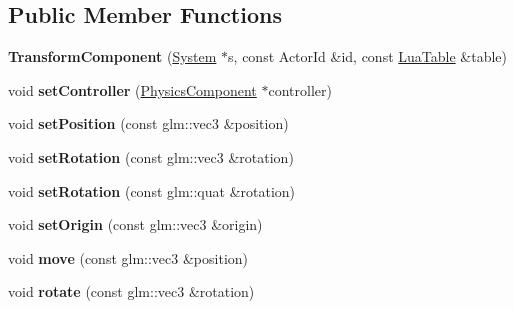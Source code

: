 \subsection*{Public Member Functions}
\begin{DoxyCompactItemize}
\item 
\mbox{\label{classTarbora_1_1TransformComponent_af8e5da2b9ccc2bae161e326a3814c1eb}} 
{\bfseries Transform\+Component} (\hyperlink{classTarbora_1_1System}{System} $\ast$s, const Actor\+Id \&id, const \hyperlink{classTarbora_1_1LuaTable}{Lua\+Table} \&table)
\item 
\mbox{\label{classTarbora_1_1TransformComponent_a76ea0d5430c91ebc1e0c2523edad45b3}} 
void {\bfseries set\+Controller} (\hyperlink{classTarbora_1_1PhysicsComponent}{Physics\+Component} $\ast$controller)
\item 
\mbox{\label{classTarbora_1_1TransformComponent_a57b646968d1f68b337190fc3a25b097b}} 
void {\bfseries set\+Position} (const glm\+::vec3 \&position)
\item 
\mbox{\label{classTarbora_1_1TransformComponent_a1aff5a9a89af7d0d10b3c965225100bc}} 
void {\bfseries set\+Rotation} (const glm\+::vec3 \&rotation)
\item 
\mbox{\label{classTarbora_1_1TransformComponent_a1045aecd38d4257b00d164682c4b42ab}} 
void {\bfseries set\+Rotation} (const glm\+::quat \&rotation)
\item 
\mbox{\label{classTarbora_1_1TransformComponent_a01333383d235e08fedf0294333578030}} 
void {\bfseries set\+Origin} (const glm\+::vec3 \&origin)
\item 
\mbox{\label{classTarbora_1_1TransformComponent_a7f39e3a183fd0aa3a43ef525416187e9}} 
void {\bfseries move} (const glm\+::vec3 \&position)
\item 
\mbox{\label{classTarbora_1_1TransformComponent_aa83be88569a1e5a46058f0927a28f627}} 
void {\bfseries rotate} (const glm\+::vec3 \&rotation)

\end{DoxyCompactItemize}
